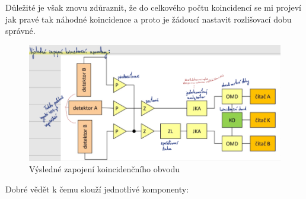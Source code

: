 Důležité je však znovu zdůraznit, že do celkového počtu koincidencí se mi projeví jak pravé tak náhodné koincidence a proto je žádoucí nastavit rozlišovací dobu správné.

\begin{figure}[H]
    \centering
    \includegraphics[width=1\linewidth]{img/Výsledné zapojení koincidenčního obvodu.png}
    \caption{Výsledné zapojení koincidenčního obvodu}
\end{figure}

Dobré vědět k čemu slouží jednotlivé komponenty:

